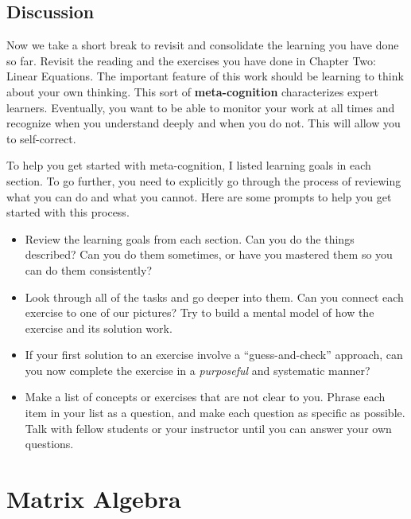 \documentclass[10pt,]{book}
\newcommand{\terminology}[1]{\textbf{#1}}
\theoremstyle{plain}
\numberwithin{equation}{section}
\begin{document}
\subsection[Discussion]{Discussion}\label{subsection-35}
Now we take a short break to revisit and consolidate the learning you
      have done so far. Revisit the reading and the exercises you have done in
      Chapter Two: Linear Equations. The important feature of this work should be
      learning to think about your own thinking. This sort of \terminology{meta-cognition}
      characterizes expert learners. Eventually, you want to be able to monitor
      your work at all times and recognize when you understand deeply and when
      you do not. This will allow you to self-correct.
\par
To help you get started with meta-cognition, I listed learning goals in
      each section. To go further, you need to explicitly go through the process
      of reviewing what you can do and what you cannot. Here are some prompts to
      help you get started with this process.
      \begin{itemize}
\item{}
          Review the learning goals from each section. Can you do the things
          described? Can you do them sometimes, or have you mastered them so you
          can do them consistently?
        \item{}
          Look through all of the tasks and go deeper into them. Can you
          connect each exercise to one of our pictures? Try to build a mental
          model of how the exercise and its solution work.
        \item{}
          If your first solution to an exercise involve a ``guess-and-check''
          approach, can you now complete the exercise in a \emph{purposeful}
          and systematic manner?
        \item{}
          Make a list of concepts or exercises that are not clear to you. Phrase
          each item in your list as a question, and make each question as
          specific as possible. Talk with fellow students or your
          instructor until you can answer your own questions.
        \end{itemize}

\clearpage
\typeout{************************************************}
\typeout{************************************************}
\section[Matrix Algebra]{Matrix Algebra}\label{matrix-algebra}
\typeout{************************************************}
\typeout{************************************************}
\end{document}
